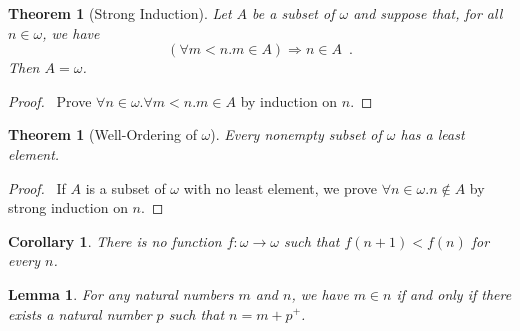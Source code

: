 \documentclass{article}
\let\qed\relax
\newtheorem{lemma}[axiom]{Lemma}
\newtheorem{theorem}[axiom]{Theorem}
\newtheorem{corollary}{Corollary}[axiom]
\theoremstyle{definition}
\begin{document}
    \begin{theorem}[Strong Induction]
        Let $A$ be a subset of $\omega$ and suppose that, for all $n \in \omega$, we have
        \[ (\forall m < n. m \in A) \Rightarrow n \in A \enspace . \]
        Then $A = \omega$.
    \end{theorem}

    \begin{proof}
        \pf\ Prove $\forall n \in \omega. \forall m < n. m \in A$ by induction on $n$. \qed
    \end{proof}
    
    \begin{theorem}[Well-Ordering of $\omega$]
        Every nonempty subset of $\omega$ has a least element.
    \end{theorem}
    
    \begin{proof}
        \pf\ If $A$ is a subset of $\omega$ with no least element, we prove $\forall n \in \omega. n \notin A$
        by strong induction on $n$. \qed
    \end{proof}

    \begin{corollary}
        There is no function $f : \omega \rightarrow \omega$ such that $f(n+1) < f(n)$ for every $n$.
    \end{corollary}

    \begin{lemma}
        \label{lemma:subtraction}
        For any natural numbers $m$ and $n$, we have $m \in n$ if and only if there exists a natural number
        $p$ such that $n = m + p^+$.
    \end{lemma}
    
\end{document}
